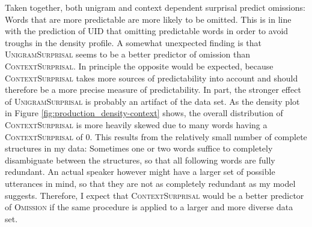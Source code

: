 Taken together, both unigram and context dependent surprisal predict omissions: Words that are more predictable are more likely to be omitted. This is in line with the prediction of UID that omitting predictable words in order to avoid troughs in the density profile. A somewhat unexpected finding is that \textsc{UnigramSurprisal} seems to be a better predictor of omission than \textsc{ContextSurprisal}. In principle the opposite would be expected, because \textsc{ContextSurprisal} takes more sources of predictability into account and should therefore be a more precise measure of predictability. In part, the stronger effect of \textsc{UnigramSurprisal} is probably an artifact of the data set. As the density plot in Figure \ref{fig:production_density-context} shows, the overall distribution of \textsc{ContextSurprisal} is more heavily skewed due to many words having a \textsc{ContextSurprisal} of 0. This results from the relatively small number of complete structures in my data: Sometimes one or two words suffice to completely disambiguate between the structures, so that all following words are fully redundant. An actual speaker however might have a larger set of possible utterances in mind, so that they are not as completely redundant as my model suggests. Therefore, I expect that \textsc{ContextSurprisal} would be a better predictor of \textsc{Omission} if the same procedure is applied to a larger and more diverse data set.


